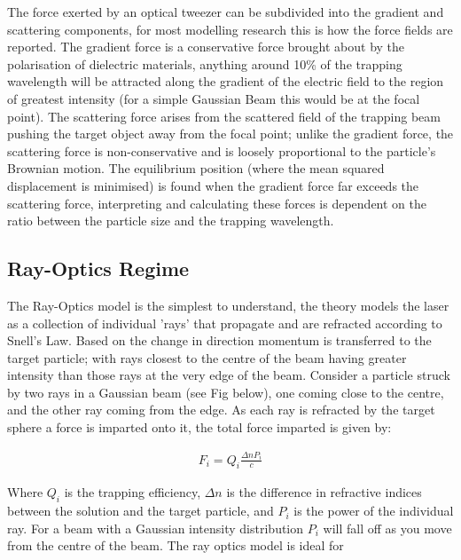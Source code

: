 \documentclass[a4paper,oneside,11pt]{book}
\begin{document}
The force exerted by an optical tweezer can be subdivided into the gradient and scattering components, for most modelling research this is how the force fields are reported. The gradient force is a conservative force brought about by the polarisation of dielectric materials, anything around 10\% of the trapping wavelength will be attracted along the gradient of the electric field to the region of greatest intensity (for a simple Gaussian Beam this would be at the focal point). The scattering force arises from the scattered field of the trapping beam pushing the target object away from the focal point; unlike the gradient force, the scattering force is non-conservative and is loosely proportional to the particle's Brownian motion. The equilibrium position (where the mean squared displacement is minimised) is found when the gradient force far exceeds the scattering force, interpreting and calculating these forces is dependent on the ratio between the particle size and the trapping wavelength.

\subsection{Ray-Optics Regime}
The Ray-Optics model is the simplest to understand, the theory models the laser as a collection of individual 'rays' that propagate and are refracted according to Snell's Law. Based on the change in direction momentum is transferred to the target particle; with rays closest to the centre of the beam having greater intensity than those rays at the very edge of the beam. Consider a particle struck by two rays in a Gaussian beam (see Fig below), one coming close to the centre, and the other ray coming from the edge. As each ray is refracted by the target sphere a force is imparted onto it, the total force imparted is given by:

\begin{align}
	F_i = Q_i\frac{\Delta n P_i}{c}
\end{align}

Where $Q_i$ is the trapping efficiency, $\Delta n$ is the difference in refractive indices between the solution and the target particle, and $P_i$ is the power of the individual ray. For a beam with a Gaussian intensity distribution $P_i$ will fall off as you move from the centre of the beam. The ray optics model is ideal for  
\end{document}
